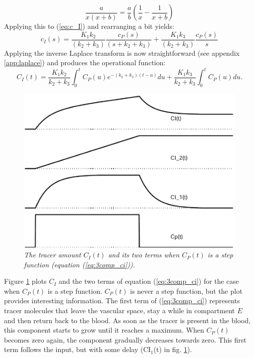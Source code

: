 \begin{equation}
  \frac{a}{x(x + b)} = \frac{a}{b} \left( \frac{1}{x} - \frac{1}{x+b} \right)
\end{equation}
Applying this to (\ref{eq:c_I}) and rearranging a bit yields:
\begin{equation}
  c_I(s) = \frac{K_1 k_2}{(k_2 + k_3)} \frac{c_P(s)}{(s + k_2 + k_3)} + 
           \frac{K_1 k_3}{(k_2 + k_3)} \frac{c_P(s)}{s}
\end{equation}
Applying the inverse Laplace transform is now straightforward (see appendix
\ref{app:laplace}) and produces the operational function:
\begin{equation}
  C_I(t) = \frac{K_1 k_2}{k_2 + k_3} \int_0^t C_P(u) e^{-(k_2 + k_3)(t - u)}du
         + \frac{K_1 k_3}{k_2 + k_3} \int_0^t C_P(u) du. \label{eq:3comp_ci}
\end{equation}

\begin{figure}[tb]
\centering
\includegraphics[width=\figone]{figs/fig_3comp_ci.pdf}
\caption{\label{fig:3comp_ci} \emph{The tracer amount $C_I(t)$ and its two
terms when $C_P(t)$ is a step function (equation (\ref{eq:3comp_ci})).}}
\end{figure}
%
Figure \ref{fig:3comp_ci} plots $C_I$ and the two terms of equation
(\ref{eq:3comp_ci}) for the case when $C_P(t)$ is a step function. $C_P(t)$ is
never a step function, but the plot provides interesting information. The
first term of (\ref{eq:3comp_ci}) represents tracer molecules that leave the
vascular space, stay a while in compartment $E$ and then return back to the
blood. As soon as the tracer is present in the blood, this component starts to
grow until it reaches a maximum. When $C_P(t)$ becomes zero again, the
component gradually decreases towards zero. This first term follows the input,
but with some delay (CI$_1$(t) in fig. \ref{fig:3comp_ci}).

